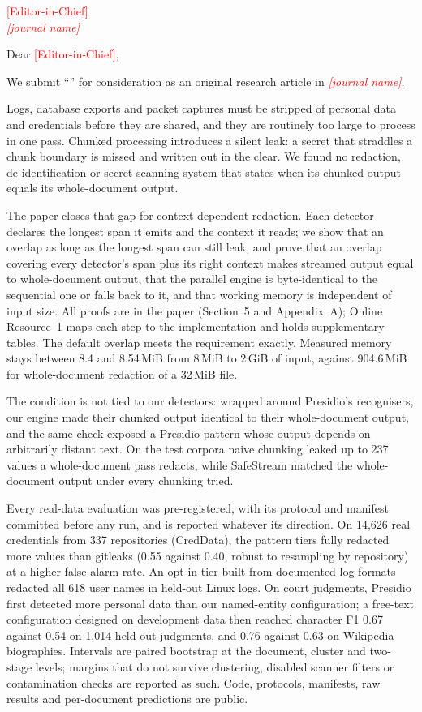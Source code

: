 \documentclass[10pt]{letter}
\date{\today}
\newcommand{\Venue}{\textcolor{red}{[journal name]}}
\newcommand{\Editor}{\textcolor{red}{[Editor-in-Chief]}}
\newcommand{\ArticleType}{original research article}
\begin{document}
\begin{letter}{\Editor\\ \emph{\Venue}}

\opening{Dear \Editor,}

We submit ``\ssTitle'' for consideration as an \ArticleType{} in \emph{\Venue}.

Logs, database exports and packet captures must be stripped of personal data and credentials before they are shared, and they are routinely too large to process in one pass. Chunked processing introduces a silent leak: a secret that straddles a chunk boundary is missed and written out in the clear. We found no redaction, de-identification or secret-scanning system that states when its chunked output equals its whole-document output.

The paper closes that gap for context-dependent redaction. Each detector declares the longest span it emits and the context it reads; we show that an overlap as long as the longest span can still leak, and prove that an overlap covering every detector's span plus its right context makes streamed output equal to whole-document output, that the parallel engine is byte-identical to the sequential one or falls back to it, and that working memory is independent of input size. All proofs are in the paper (Section~5 and Appendix~A); Online Resource~1 maps each step to the implementation and holds supplementary tables. The default overlap meets the requirement exactly. Measured memory stays between 8.4 and 8.54\,MiB from 8\,MiB to 2\,GiB of input, against 904.6\,MiB for whole-document redaction of a 32\,MiB file.

The condition is not tied to our detectors: wrapped around Presidio's recognisers, our engine made their chunked output identical to their whole-document output, and the same check exposed a Presidio pattern whose output depends on arbitrarily distant text. On the test corpora naive chunking leaked up to 237 values a whole-document pass redacts, while SafeStream matched the whole-document output under every chunking tried.

Every real-data evaluation was pre-registered, with its protocol and manifest committed before any run, and is reported whatever its direction. On 14,626 real credentials from 337 repositories (CredData), the pattern tiers fully redacted more values than gitleaks (0.55 against 0.40, robust to resampling by repository) at a higher false-alarm rate. An opt-in tier built from documented log formats redacted all 618 user names in held-out Linux logs. On court judgments, Presidio first detected more personal data than our named-entity configuration; a free-text configuration designed on development data then reached character F1 0.67 against 0.54 on 1,014 held-out judgments, and 0.76 against 0.63 on Wikipedia biographies. Intervals are paired bootstrap at the document, cluster and two-stage levels; margins that do not survive clustering, disabled scanner filters or contamination checks are reported as such. Code, protocols, manifests, raw results and per-document predictions are public.


\end{letter}
\end{document}
